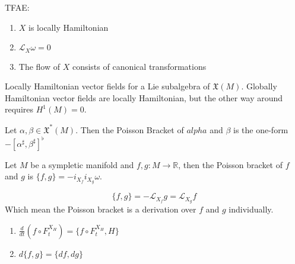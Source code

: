 \begin{prop}

TFAE:

\begin{enumerate}
    \item $X$ is locally Hamiltonian
    \item $\mathcal{L}_X \omega = 0$ 
    \item The flow of $X$ consists of canonical transformations
    
\end{enumerate}

\end{prop}

\begin{rmk}

Locally Hamiltonian vector fields for a Lie subalgebra of $\mathfrak{X}(M)$. Globally Hamiltonian vector fields are locally Hamiltonian, but the other way around requires $H^1(M) = 0$. 

\end{rmk}

\begin{defn}

Let $\alpha, \beta \in \mathfrak{X}^*(M)$. Then the Poisson Bracket of $alpha$ and $\beta$ is the one-form $-[\alpha^{\sharp}, \beta^{\sharp}]^{\flat}$

\end{defn}

\begin{defn}

Let $M$ be a sympletic manifold and $f,g: M \to \mathbb{R}$, then the Poisson bracket of $f$ and $g$ is $ \{f,g\} = - i_{X_f} i_{X_g} \omega$.

\end{defn}

\begin{prop}
\[\{f,g\} = - \mathcal{L}_{X_f}g = \mathcal{L}_{X_g}f\]
\indent Which mean the Poisson bracket is a derivation over $f$ and $g$ individually.
\end{prop}

\begin{cor}
\hfill
\begin{enumerate}
    \item $\frac{d}{dt}(f \circ F^{X_H}_t) = \{f \circ F^{X_H}_t, H\}$
    \item $d\{f,g\} = \{df, dg\}$
\end{enumerate}

\end{cor}

